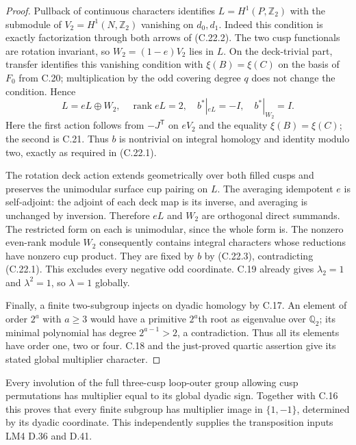 \begin{proof}
Pullback of continuous characters identifies
$L=H^1(P,\mathbb Z_2)$ with the submodule of
$V_2=H^1(N,\mathbb Z_2)$ vanishing on $d_0,d_1$.
Indeed this condition is exactly factorization
through both arrows of (C.22.2).  The two cusp
functionals are rotation invariant, so
$W_2=(1-e)V_2$ lies in $L$.  On the deck-trivial
part, transfer identifies this vanishing condition
with $\xi(B)=\xi(C)$ on the basis of $F_0$ from
C.20; multiplication by the odd covering degree
$q$ does not change the condition.  Hence
\[
 L=eL\oplus W_2,\quad\operatorname{rank}eL=2,\quad
 b^*|_{eL}=-I,\quad b^*|_{W_2}=I.                          \tag{C.22.3}
\]
Here the first action follows from $-J^{\mathsf T}$
on $eV_2$ and the equality $\xi(B)=\xi(C)$;
the second is C.21.  Thus $b$ is nontrivial on
integral homology and identity modulo two,
exactly as required in (C.22.1).

The rotation deck action extends geometrically
over both filled cusps and preserves the
unimodular surface cup pairing on $L$.
The averaging idempotent $e$ is self-adjoint:
the adjoint of each deck map is its inverse,
and averaging is unchanged by inversion.
Therefore $eL$ and $W_2$ are orthogonal direct
summands.  The restricted form on each is
unimodular, since the whole form is.  The
nonzero even-rank module $W_2$ consequently
contains integral characters whose reductions
have nonzero cup product.  They are fixed by
$b$ by (C.22.3), contradicting (C.22.1).
This excludes every negative odd coordinate.
C.19 already gives $\lambda_2=1$ and
$\lambda^2=1$, so $\lambda=1$ globally.

Finally, a finite two-subgroup injects on dyadic
homology by C.17.  An element of order $2^a$ with
$a\geq3$ would have a primitive $2^a$th root as
eigenvalue over $\mathbb Q_2$; its minimal
polynomial has degree $2^{a-1}>2$, a contradiction.
Thus all its elements have order one, two or
four.  C.18 and the just-proved quartic assertion
give its stated global multiplier character.
\end{proof}
Every involution of the full three-cusp loop-outer
group allowing cusp permutations has multiplier
equal to its global dyadic sign.  Together with
C.16 this proves that every finite subgroup has
multiplier image in $\{1,-1\}$, determined by
its dyadic coordinate.  This independently supplies
the transposition inputs LM4 D.36 and D.41.

